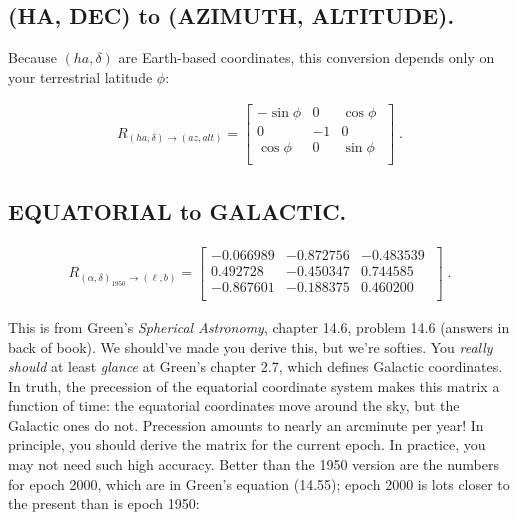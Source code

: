 \documentclass[]{article}
\begin{document}
\subsection {(HA, DEC) to (AZIMUTH, ALTITUDE).}

    Because $(ha, \delta)$ are Earth-based coordinates, this
conversion depends only on your terrestrial latitude $\phi$:

\begin{eqnarray} 
{R}_{(ha, \delta) \rightarrow (az, alt)} = \left[ 
\begin{array}{ccc} 
-\sin \phi &    0    & \cos \phi \\ 
      0    &   -1    &    0      \\ 
 \cos \phi &    0    & \sin \phi \\ 
\end{array} 
\; \right] \; .
\end{eqnarray} 

\subsection {EQUATORIAL to GALACTIC.}

\begin{eqnarray} 
{R}_{(\alpha, \delta)_{1950} \rightarrow (\ell, b)} = \left[ 
\begin{array}{rrr}
   -0.066989 &  -0.872756 &  -0.483539 \\
    0.492728 &  -0.450347 &   0.744585 \\
   -0.867601 &  -0.188375 &   0.460200 \\
 \end{array} 
\; \right] \; .
\end{eqnarray} 

\noindent This is from Green's {\it Spherical Astronomy}, chapter 14.6,
problem 14.6 (answers in back of book).  We should've made you derive
this, but we're softies.  You {\it really should} at least {\it glance}
at Green's chapter 2.7, which defines Galactic coordinates.  In truth,
the precession of the equatorial coordinate system makes this matrix a
function of time: the equatorial coordinates move around the sky, but
the Galactic ones do not.  Precession amounts to nearly an arcminute per
year! In principle, you should derive the matrix for the current epoch. 
In practice, you may not need such high accuracy.  Better than the 1950
version are the numbers for epoch 2000, which are in Green's equation
(14.55); epoch 2000 is lots closer to the present than is epoch 1950:
\end{document}
